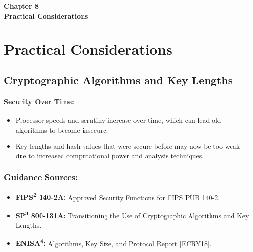 


\clearpage
\thispagestyle{empty} 
\begin{center}
    \vspace*{\fill} 
    \Huge \textbf{Chapter 8} \\
    \Huge \textbf{Practical Considerations} 
    \vspace*{\fill}
\end{center}
\clearpage

\chapter{Practical Considerations}

\section{Cryptographic Algorithms and Key Lengths}

\subsubsection{Security Over Time:}
\begin{itemize}
    \item Processor speeds and scrutiny increase over time, which can lead old algorithms to become insecure.
    \item Key lengths and hash values that were secure before may now be too weak due to increased computational power and analysis techniques.
\end{itemize}

\subsection{Guidance Sources:}
\begin{itemize}
    \item \textbf{FIPS\textsuperscript{2} 140-2A:} Approved Security Functions for FIPS PUB 140-2.
    \item \textbf{SP\textsuperscript{3} 800-131A:} Transitioning the Use of Cryptographic Algorithms and Key Lengths.
    \item \textbf{ENISA\textsuperscript{4}:} Algorithms, Key Size, and Protocol Report [ECRY18].
\end{itemize}

